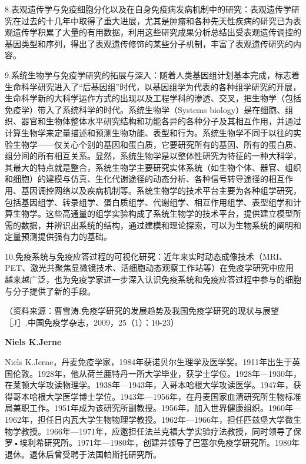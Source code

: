 8.表观遗传学与免疫细胞分化以及在自身免疫病发病机制中的研究：表观遗传学研究在过去的十几年中取得了重大进展，尤其是肿瘤和各种先天性疾病的研究已为表观遗传学积累了大量的有用数据，利用这些研究成果分析总结出受表观遗传调控的基因类型和序列，得出了表观遗传修饰的某些分子机制，丰富了表观遗传研究的内容。

9.系统生物学与免疫学研究的拓展与深入：随着人类基因组计划基本完成，标志着生命科学研究进入了“后基因组”时代，以基因组学为代表的各种组学研究的开展，生命科学新的大科学运作方式的出现以及工程学科的渗透、交叉，把生物学（包括免疫学）带入了系统科学的时代。系统生物学（Systems
biology）是在细胞、组织、器官和生物体整体水平研究结构和功能各异的各种分子及其相互作用，并通过计算生物学来定量描述和预测生物功能、表型和行为。系统生物学不同于以往的实验生物学------仅关心个别的基因和蛋白质，它要研究所有的基因、所有的蛋白质、组分间的所有相互关系。显然，系统生物学是以整体性研究为特征的一种大科学，其最大的特点就是整合，系统生物学主要研究实体系统（如生物个体、器官、组织和细胞）的建模与仿真、生化代谢途径的动态分析、各种信号转导途径的相互作用、基因调控网络以及疾病机制等。系统生物学的技术平台主要为各种组学研究，包括基因组学、转录组学、蛋白质组学、代谢组学、相互作用组学、表型组学和计算生物学。这些高通量的组学实验构成了系统生物学的技术平台，提供建立模型所需的数据，并辨识出系统的结构，通过建模和理论探索，可以为生物系统的阐明和定量预测提供强有力的基础。

10.免疫系统与免疫应答过程的可视化研究：近年来实时动态成像技术（MRI、
PET、激光共聚焦显微镜技术、活细胞动态观察工作站等）在免疫学研究中应用越来越广泛，也为免疫学家进一步深入认识免疫系统和免疫应答过程中参与的细胞与分子提供了新的手段。

（资料来源：曹雪涛.免疫学研究的发展趋势及我国免疫学研究的现状与展望［J］.中国免疫学杂志，2009，25（1）：10-23）


\begin{center}
    \textbf{\Large  Niels K.Jerne}
\end{center}

Niels
K.Jerne，丹麦免疫学家，1984年获诺贝尔生理学及医学奖。1911年出生于英国伦敦。1928年，他从荷兰鹿特丹一所大学毕业，获学士学位。1928年---1930年，在莱顿大学攻读物理学。1938年---1943年，入哥本哈根大学攻读医学。1947年，获得哥本哈根大学医学博士学位。1943年---1956年，在丹麦国家血清研究所生物标准局兼职工作。1951年成为该研究所副教授。1956年，加入世界健康组织。1960年---1962年，担任日内瓦大学生物物理学教授。1962年---1966年，担任匹兹堡大学微生物学教授。1966年---1971年，应邀担任法兰克福大学实验疗法教授，同时领导了保罗•埃利希研究所。1971年---1980年，创建并领导了巴塞尔免疫学研究所。1980年退休。退休后曾受聘于法国帕斯托研究所。

